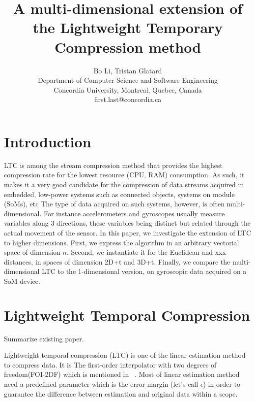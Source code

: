 \documentclass[10pt, conference, compsocconf]{IEEEtran}
\begin{document}
\title{A multi-dimensional extension of the Lightweight Temporary Compression method}

\author{Bo Li, Tristan Glatard\\
  Department of Computer Science and Software Engineering\\ Concordia University, Montreal, Quebec, Canada\\
  {first.last}@concordia.ca \vspace*{-0.5cm}}

\maketitle

\begin{abstract}
\end{abstract}

\section{Introduction}

LTC is among the stream compression method that provides the highest 
compression rate for the lowest resource (CPU, RAM) consumption. As 
such, it makes it a very good candidate for the compression of data 
streams acquired in embedded, low-power systems such as connected 
objects, systems on module (SoMs), etc The type of data acquired on 
such systems, however, is often multi-dimensional. For instance 
accelerometers and gyroscopes usually measure variables along 3 
directions, these variables being distinct but related through the 
actual movement of the sensor. In this paper, we investigate the 
extension of LTC to higher dimensions. First, we express the algorithm 
in an arbitrary vectorial space of dimension $n$. Second, we 
instantiate it for the Euclidean and xxx distances, in spaces of 
dimension 2D+t and 3D+t. Finally, we compare the multi-dimensional LTC 
to the 1-dimensional version, on gyroscopic data acquired on a SoM 
device.

\section{Lightweight Temporal Compression}

Summarize existing paper.

Lightweight temporal compression (LTC) is one of the linear estimation method to compress data. It is The first-order interpolator with two degrees of freedom(FOI-2DF) which is mentioned in ~\cite{jalaleddine1990ecg}.  Most of linear estimation method need a predefined parameter which is the error margin (let's call $\epsilon$) in order to guarantee the difference between estimation and original data within a scope.
\end{document}

